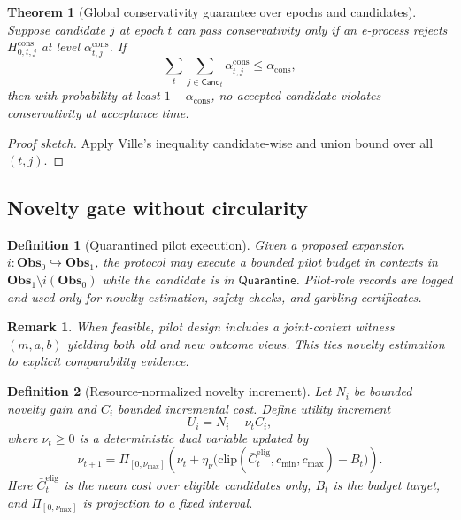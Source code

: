 \documentclass[11pt,a4paper]{article}
\newtheorem{theorem}{Theorem}[section]
\newtheorem{definition}{Definition}[section]
\newtheorem{remark}{Remark}[section]
\newcommand{\Obs}{\mathbf{Obs}}
\newcommand{\Quar}{\mathsf{Quarantine}}
\newcommand{\Cand}{\mathsf{Cand}}
\begin{document}
\begin{theorem}[Global conservativity guarantee over epochs and candidates]
\label{thm:conserv}
Suppose candidate $j$ at epoch $t$ can pass conservativity only if an e-process rejects
$H^{\mathrm{cons}}_{0,t,j}$ at level $\alpha^{\mathrm{cons}}_{t,j}$.
If
\[
\sum_t\sum_{j\in\Cand_t}\alpha^{\mathrm{cons}}_{t,j}\le \alpha_{\mathrm{cons}},
\]
then with probability at least $1-\alpha_{\mathrm{cons}}$, no accepted candidate violates conservativity at acceptance time.
\end{theorem}
\begin{proof}[Proof sketch]
Apply Ville's inequality candidate-wise and union bound over all $(t,j)$.
\end{proof}

\subsection{Novelty gate without circularity}
\begin{definition}[Quarantined pilot execution]
Given a proposed expansion $i:\Obs_0\hookrightarrow\Obs_1$, the protocol may execute a bounded pilot budget in contexts in $\Obs_1\setminus i(\Obs_0)$ while the candidate is in $\Quar$.
Pilot-role records are logged and used only for novelty estimation, safety checks, and garbling certificates.
\end{definition}
\begin{remark}
When feasible, pilot design includes a joint-context witness $(m,a,b)$ yielding both old and new outcome views.
This ties novelty estimation to explicit comparability evidence.
\end{remark}

\begin{definition}[Resource-normalized novelty increment]
Let $N_i$ be bounded novelty gain and $C_i$ bounded incremental cost.
Define utility increment
\[
U_i=N_i-\nu_t C_i,
\]
where $\nu_t\ge0$ is a deterministic dual variable updated by
\[
\nu_{t+1}=\Pi_{[0,\nu_{\max}]}\!\left(\nu_t+\eta_\nu\big(\mathrm{clip}(\bar C_t^{\mathrm{elig}},c_{\min},c_{\max})-B_t\big)\right).
\]
Here $\bar C_t^{\mathrm{elig}}$ is the mean cost over \emph{eligible} candidates only, $B_t$ is the budget target, and $\Pi_{[0,\nu_{\max}]}$ is projection to a fixed interval.
\end{definition}
\end{document}
